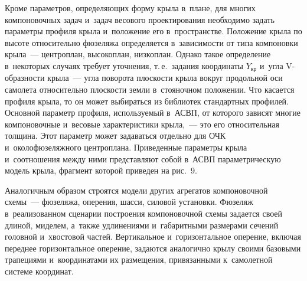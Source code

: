 \begin{multicols}{2}
  Кроме параметров, опре\-де\-ля\-ющих форму крыла в~плане, для многих 
компоновочных задач и~задач весового проектирования необходимо задать 
па\-ра\-мет\-ры профиля крыла и~положение его в~пространстве. Положение крыла 
по высоте относительно фюзеляжа определяется в~за\-ви\-си\-мости от типа 
компоновки крыла~--- центроплан, высокоплан, низкоплан. Однако такое 
определение в~некоторых случаях требует уточнения, т.\,е.\ задания координаты 
$Y_{\mathrm{кр}}$ и~угла V-образ\-ности крыла~---  угла поворота 
плоскости крыла вокруг продольной оси самолета относительно плос\-кости 
земли в~стояночном положении. Что касается профиля крыла, то он может 
выбираться из биб\-лио\-тек стандартных профилей. Основной параметр профиля, 
ис\-поль\-зу\-емый в~\mbox{АСВП}, от которого зависят многие компоновочные и~весовые 
характеристики крыла,~--- это его относительная толщина. Этот параметр 
может задаваться отдельно для ОЧК и~околофюзеляжного центроплана. 
Приведенные па\-ра\-мет\-ры крыла и~соотношения между ними представляют 
собой в~\mbox{АСВП} па\-ра\-мет\-ри\-че\-скую модель крыла, фрагмент которой приведен на 
рис.~9.
  


    Аналогичным образом строятся модели других агрегатов компоновочной 
схемы~--- фюзеляжа, оперения, шасси, силовой установки. Фюзеляж 
в~реализованном сценарии по\-стро\-ения компоновочной схемы задается своей 
длиной, миделем, а~так\-же удли\-не\-ни\-ями и~габаритными размерами сечений 
головной и~хвос\-то\-вой частей. Вертикальное и~горизонтальное оперение, 
включая переднее горизонтальное оперение, задаются аналогично крылу 
своими базовыми трапециями и~координатами их размещения, привязанными 
к~самолетной сис\-те\-ме координат.

\begin{figure*} %
\vspace*{1pt}
      \begin{center}
     \mbox{%
\epsfxsize=160mm 
}
\end{center}
\vspace*{-9pt}
\end{figure*}


\end{multicols}
